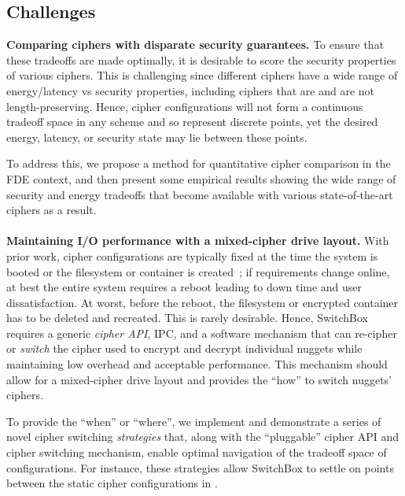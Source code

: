 
\subsection{Challenges}

\textbf{Comparing ciphers with disparate security guarantees.} To ensure that
these tradeoffs are made optimally, it is desirable to score the security
properties of various ciphers. This is challenging since different ciphers have
a wide range of energy/latency vs security properties, including ciphers that
are and are not length-preserving. Hence, cipher configurations will not form a
continuous tradeoff space in any scheme and so represent discrete points, yet
the desired energy, latency, or security state may lie between these points.

To address this, we propose a method for quantitative cipher comparison in the
FDE context, and then present some empirical results showing the wide range of
security and energy tradeoffs that become available with various
state-of-the-art ciphers as a result.\\
\\
\textbf{Maintaining I/O performance with a mixed-cipher drive layout.} With
prior work, cipher configurations are typically fixed at the time the system is
booted or the filesystem or container is created~\cite{CiteAllTheFilesystems};
if requirements change online, at best the entire system requires a reboot
leading to down time and user dissatisfaction. At worst, before the reboot, the
filesystem or encrypted container has to be deleted and recreated. This is
rarely desirable. Hence, SwitchBox requires a generic \emph{cipher API}, IPC,
and a software mechanism that can re-cipher or \emph{switch} the cipher used to
encrypt and decrypt individual nuggets while maintaining low overhead and
acceptable performance. This mechanism should allow for a mixed-cipher drive
layout and provides the ``how'' to switch nuggets' ciphers.

To provide the ``when'' or ``where'', we implement and demonstrate a series of
novel cipher switching \textit{strategies} that, along with the ``pluggable''
cipher API and cipher switching mechanism, enable optimal navigation of the
tradeoff space of configurations. For instance, these strategies allow SwitchBox
to settle on points between the static cipher configurations in
.

